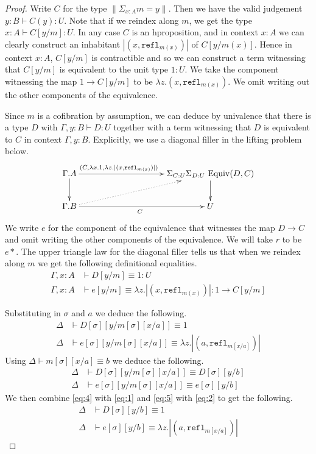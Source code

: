 \documentclass[a4paper]{amsart}
\theoremstyle{definition}
\newcommand{\hequiv}{\operatorname{Equiv}}
\newcommand{\refl}{\mathtt{refl}}
\begin{document}
\begin{proof}
  Write $C$ for the type $\|\Sigma_{x : A} m = y \|$. Then we
  have the valid judgement $y : B \vdash C(y) : U$.  Note that if we
  reindex along $m$, we get the type $x : A \vdash C[y/m] : U$. In
  any case $C$ is an hproposition, and in context
  $x : A$ we can clearly construct an inhabitant
  $| (x, \refl_{m(x)}) |$ of $C[y/m(x)]$. Hence in context $x : A$,
  $C[y/m]$ is contractible and so we can construct a term witnessing
  that $C[y/m]$ is equivalent to the unit type $1 : U$. We take the
  component witnessing the map $1 \to C[y/m]$ to be $\lambda z.(x,
  \refl_{m(x)})$. We omit writing out the other components of the
  equivalence.

  Since $m$ is a cofibration by assumption, we can deduce by
  univalence that there is a type $D$ with
  $\Gamma, y : B \vdash D : U$ together with a term witnessing that
  $D$ is equivalent to $C$ in context $\Gamma, y :
  B$. Explicitly, we use a diagonal filler in the lifting problem
  below.
  \begin{equation*}
    \xymatrix@C=10em{ \Gamma.A \ar[r]^(0.35){(C, \lambda x.1, \lambda
        z.|(x, \refl_{m(x)})|)} \ar[d] &
      \Sigma_{C : U} \Sigma_{D : U} \, \hequiv(D, C) \ar[d] \\
      \Gamma.B \ar[r]_C \ar@{.>}[ur] & U}
  \end{equation*}
  We write
  $e$ for the component of the equivalence that witnesses the map
  $D \to C$ and omit writing the other components of the
  equivalence. We will take $r$ to be $e \ast$. The upper
  triangle law for the diagonal filler tells us that when we reindex
  along $m$ we get the following definitional equalities.
  \begin{align*}
    \Gamma, x : A &\vdash D[y/m] \equiv 1 : U \\
    \Gamma, x : A &\vdash e[y/m] \equiv \lambda z.|(x, \refl_{m(x)})| : 1 \to
  C[y/m]
  \end{align*}

  Substituting in $\sigma$ and $a$ we deduce the following.
  \begin{align}
    \Delta &\vdash D[\sigma][y/m[\sigma][x/a]] \equiv 1 \label{eq:4}\\
    \Delta &\vdash e[\sigma][y/m[\sigma][x/a]] \equiv \lambda z.|(a,
             \refl_{m[x/a]})| \label{eq:5}
  \end{align}
  Using $\Delta \vdash m[\sigma][x/a] \equiv b$ we deduce the following.
  \begin{align}
    \Delta &\vdash D[\sigma][y/m[\sigma][x/a]] \equiv
             D[\sigma][y/b] \label{eq:1} \\
    \Delta &\vdash e[\sigma][y/m[\sigma][x/a]] \equiv
             e[\sigma][y/b] \label{eq:2}
  \end{align}
  We then combine \eqref{eq:4} with \eqref{eq:1} and \eqref{eq:5} with
  \eqref{eq:2} to get the following.
  \begin{align}
    \Delta &\vdash D[\sigma][y/b] \equiv 1 \label{eq:6}\\
    \Delta &\vdash e[\sigma][y/b] \equiv \lambda z.|(a,
             \refl_{m[x/a]})| \label{eq:7}
  \end{align}


\end{proof}
\end{document}
